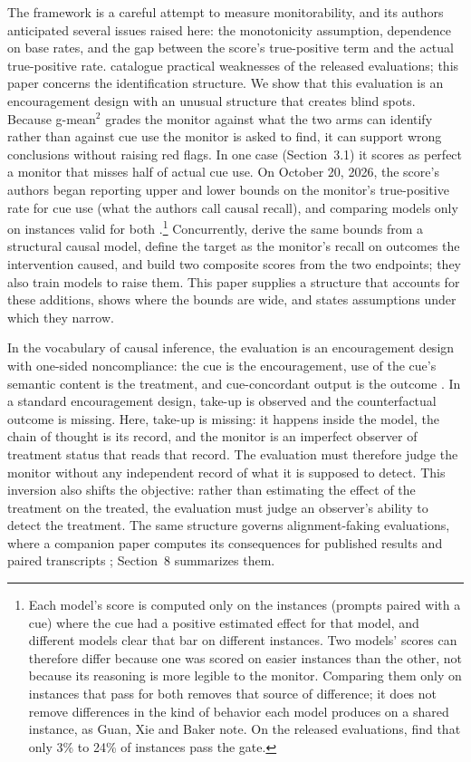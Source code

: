 \documentclass[11pt]{article}
\begin{document}
The framework is a careful attempt to measure monitorability, and its authors anticipated several issues raised here: the monotonicity assumption, dependence on base rates, and the gap between the score’s true-positive term and the actual true-positive rate. \citet{dilgren2026evaluating} catalogue practical weaknesses of the released evaluations; this paper concerns the identification structure. We show that this evaluation is an encouragement design with an unusual structure that creates blind spots. Because g-mean$^2$ grades the monitor against what the two arms can identify rather than against cue use the monitor is asked to find, it can support wrong conclusions without raising red flags. In one case (Section~3.1) it scores as perfect a monitor that misses half of actual cue use. On October 20, 2026, the score’s authors began reporting upper and lower bounds on the monitor’s true-positive rate for cue use (what the authors call causal recall), and comparing models only on instances valid for both \citep*{guan2026beyond}.\footnote{Each model’s score is computed only on the instances (prompts paired with a cue) where the cue had a positive estimated effect for that model, and different models clear that bar on different instances. Two models’ scores can therefore differ because one was scored on easier instances than the other, not because its reasoning is more legible to the monitor. Comparing them only on instances that pass for both removes that source of difference; it does not remove differences in the kind of behavior each model produces on a shared instance, as Guan, Xie and Baker note. On the released evaluations, \citet{dilgren2026evaluating} find that only 3\% to 24\% of instances pass the gate.} Concurrently, \citet{fu2026learning} derive the same bounds from a structural causal model, define the target as the monitor’s recall on outcomes the intervention caused, and build two composite scores from the two endpoints; they also train models to raise them. This paper supplies a structure that accounts for these additions, shows where the bounds are wide, and states assumptions under which they narrow.

In the vocabulary of causal inference, the evaluation is an encouragement design with one-sided noncompliance: the cue is the encouragement, use of the cue’s semantic content is the treatment, and cue-concordant output is the outcome \citep{angrist1996identification}. In a standard encouragement design, take-up is observed and the counterfactual outcome is missing. Here, take-up is missing: it happens inside the model, the chain of thought is its record, and the monitor is an imperfect observer of treatment status that reads that record. The evaluation must therefore judge the monitor without any independent record of what it is supposed to detect. This inversion also shifts the objective: rather than estimating the effect of the treatment on the treated, the evaluation must judge an observer’s ability to detect the treatment. The same structure governs alignment-faking evaluations, where a companion paper computes its consequences for published results and paired transcripts \citep{diamond2026scratchpad}; Section~8 summarizes them.
\end{document}
